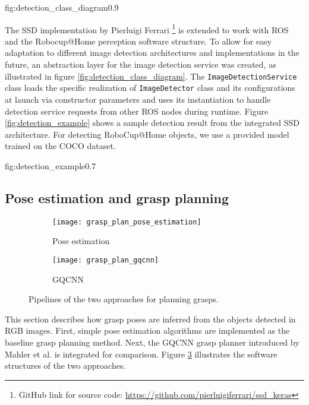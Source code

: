              {fig:detection_class_diagram}{0.9\textwidth}

The SSD implementation by Pierluigi Ferrari \footnote{GitHub link for source code:
\url{https://github.com/pierluigiferrari/ssd_keras}} is extended to work with ROS and the Robocup@Home perception
software structure. To allow for easy adaptation to different image detection architectures and implementations in the
future, an abstraction layer for the image detection service was created, as illustrated in figure
\ref{fig:detection_class_diagram}. The \texttt{ImageDetectionService} class loads the specific realization of
\texttt{ImageDetector} class and its configurations at launch via constructor parameters and uses its instantiation to
handle detection service requests from other ROS nodes during runtime. Figure \ref{fig:detection_example} shows a
sample detection result from the integrated SSD architecture. For detecting RoboCup@Home objects, we use a provided
model trained on the COCO dataset.

{fig:detection_example}{0.7\textwidth}

\subsection{Pose estimation and grasp planning}

\begin{figure}[h!]
    \centering
    \small
    \begin{subfigure}[b]{0.25\textwidth}
        \texttt{[image: grasp\_plan\_pose\_estimation]}
        \caption{Pose estimation}
        \label{fig:grasp_plan_pose_estimation}
    \end{subfigure}
    \hfill  %
    \begin{subfigure}[b]{0.6\textwidth}
        \texttt{[image: grasp\_plan\_gqcnn]}
        \caption{GQCNN \cite{mahler2017}}
        \label{fig:grasp_plan_gqcnn}
    \end{subfigure}
    \caption{Pipelines of the two approaches for planning grasps.} \label{fig:grasp_planners}
\end{figure}

This section describes how grasp poses are inferred from the objects detected in RGB images. First, simple pose
estimation algorithms are implemented as the baseline grasp planning method. Next, the GQCNN grasp planner introduced
by Mahler et al. \cite{mahler2017} is integrated for comparison. Figure \ref{fig:grasp_planners} illustrates the
software structures of the two approaches.

